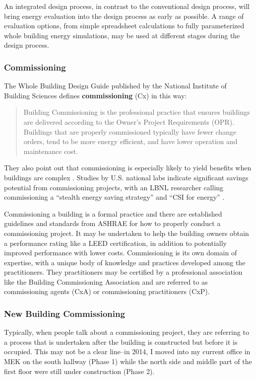 \documentclass[10pt]{article}
\begin{document}
An integrated design process, in contrast to the conventional design process, will bring energy evaluation into the design process as early as possible. A range of evaluation options, from simple spreadsheet calculations to fully parameterized whole building energy simulations, may be used at different stages during the design process. 

\subsubsection{Commissioning}

The Whole Building Design Guide published by the National Institute of Building Sciences defines \textbf{commissioning} (Cx) in this way:

\begin{quote}
  Building Commissioning is the professional practice that ensures buildings are delivered according to the Owner's Project Requirements (OPR). Buildings that are properly commissioned typically have fewer change orders, tend to be more energy efficient, and have lower operation and maintenance cost.   \cite{bldgcx}
\end{quote}

They also point out that commissioning is especially likely to yield benefits when buildings are complex  \cite{bldgcx}. Studies by U.S. national labs indicate significant savings potential from commissioning projects, with an LBNL researcher calling commissioning a ``stealth energy saving strategy'' and ``CSI for energy'' \cite{mills}.

Commissioning a building is a formal practice and there are established guidelines and standards from ASHRAE for how to properly conduct a commissioning project. It may be undertaken to help the building owners obtain a performance rating like a LEED certification, in addition to potentially improved performance with lower costs. Commissioning is its own domain of expertise, with a unique body of knowledge and practices developed among the practitioners. They practitioners may be certified by a professional association like the Building Commissioning Association and are referred to as commissioning agents (CxA) or commissioning practitioners (CxP).

\subsubsection{New Building Commissioning}

Typically, when people talk about a commissioning project, they are referring to a process that is undertaken after the building is constructed but before it is occupied. This may not be a clear line--in 2014, I moved into my current office in MEK on the south hallway (Phase 1) while the north side and middle part of the first floor were still under construction (Phase 2).
\end{document}

